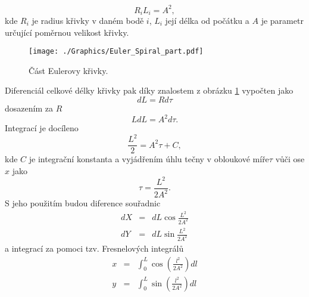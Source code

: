 \documentclass[czech, bc, kky, he, iso690numb]{fasthesis}
\begin{document}
                    \begin{equation}
                        R_{i}L_{i} = A^{2},
                        \label{eqn:clothoid equation}
                    \end{equation}
                 kde \(R_{i}\) je radius křivky v daném bodě \(i\), \(L_{i}\) její délka od počátku a \(A\) je parametr určující poměrnou velikost křivky.
                 	\begin{figure}[h]
                 		\centering
                 		\texttt{[image: ./Graphics/Euler\_Spiral\_part.pdf]}
                 		\caption{Část Eulerovy křivky.}
                 		\label{pic:Eulerova_krivka_cast}
                 	\end{figure}
                 Diferenciál celkové délky křivky pak díky znalostem z obrázku \ref{pic:Eulerova_krivka_cast} vypočten jako
                    \begin{equation}
                        d L = R d\tau
                    \end{equation}
                dosazením za \(R\)
                    \begin{equation}
                        L d L = A^{2}d\tau.
                    \end{equation}
                Integrací je docíleno
                    \begin{equation}
                        \frac{L^{2}}{2} = A^{2}\tau + C,
                    \end{equation}
                kde \(C\) je integrační konstanta a vyjádřením úhlu tečny v obloukové míře\(\tau\) vůči ose \(x\) jako
                    \begin{equation}
                        \tau = \frac{L^{2}}{2A^{2}}.
                    \end{equation}
                S jeho použitím budou diference souřadnic
                    \begin{eqnarray}
                        d X & = & d L\cos{\frac{L^{2}}{2A^{2}}}\\
                        d Y & = & d L\sin{\frac{L^{2}}{2A^{2}}}
                    \end{eqnarray}
                a integrací za pomoci tzv. Fresnelových integrálů
                    \begin{eqnarray}
                        x & = & \int_{0}^{L}\cos(\frac{l^{2}}{2A^{2}})dl\\
                        y & = &\int_{0}^{L}\sin(\frac{l^{2}}{2A^{2}})dl
                    \end{eqnarray}
\end{document}
